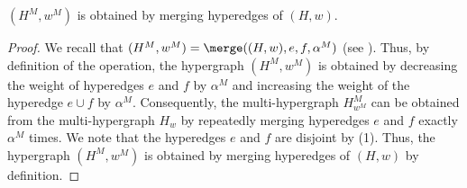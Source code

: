     \begin{claim}\label{claim:WeakToStrong:MergeProperty:H^Mw^M-from-Hw}
        $(H^M,w^M)$ is obtained by merging hyperedges of $(H, w)$.
    \end{claim}
    \begin{proof}
        We recall that $(H^M, w^M) = \merge((H,w), e, f, \alpha^M)$ (see  ).
        Thus, by definition of the \merge operation, the hypergraph $(H^M, w^M)$ is obtained by decreasing the weight of hyperedges $e$ and $f$ by $\alpha^M$ and increasing the weight of the hyperedge $e\cup f$ by $\alpha^M$. Consequently, the multi-hypergraph $H^M_{w^M}$ can be obtained from the multi-hypergraph $H_w$ by repeatedly merging hyperedges $e$ and $f$ exactly $\alpha^M$ times. We note that the hyperedges $e$ and $f$ are disjoint by (1). Thus, the hypergraph $(H^M,w^M)$ is obtained by merging hyperedges of $(H, w)$ by definition. 
    \end{proof}


